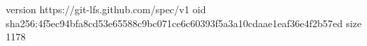 version https://git-lfs.github.com/spec/v1
oid sha256:4f5ec94bfa8cd53e65588c9bc071ce6c60393f5a3a10cdaae1eaf36e4f2b57ed
size 1178
